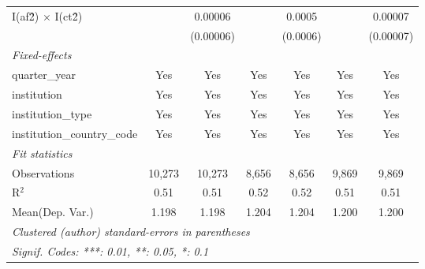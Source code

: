 \begin{tabular}{lcccccc}
   I(af\^2) $\times$ I(ct\^2)         &               & 0.00006        &               & 0.0005         &               & 0.00007\\   
                                      &               & (0.00006)      &               & (0.0006)       &               & (0.00007)\\   
   \midrule
   \emph{Fixed-effects}\\
   quarter\_year                      & Yes           & Yes            & Yes           & Yes            & Yes           & Yes\\  
   institution                        & Yes           & Yes            & Yes           & Yes            & Yes           & Yes\\  
   institution\_type                  & Yes           & Yes            & Yes           & Yes            & Yes           & Yes\\  
   institution\_country\_code         & Yes           & Yes            & Yes           & Yes            & Yes           & Yes\\  
   \midrule
   \emph{Fit statistics}\\
   Observations                       & 10,273        & 10,273         & 8,656         & 8,656          & 9,869         & 9,869\\  
   R$^2$                              & 0.51          & 0.51           & 0.52          & 0.52           & 0.51          & 0.51\\  
Mean(Dep. Var.) & 1.198 & 1.198 & 1.204 & 1.204 & 1.200 & 1.200 \\
   \midrule \midrule
   \multicolumn{7}{l}{\emph{Clustered (author) standard-errors in parentheses}}\\
   \multicolumn{7}{l}{\emph{Signif. Codes: ***: 0.01, **: 0.05, *: 0.1}}\\
\end{tabular}
\par\endgroup

